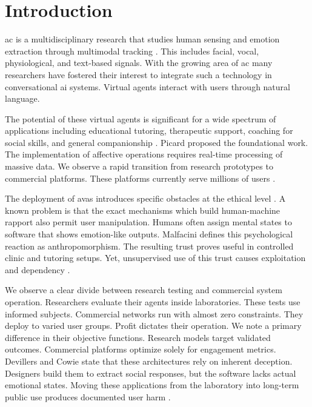 \section{Introduction}

\gls{ac} is a multidisciplinary research that studies human sensing and emotion extraction through multimodal tracking \cite[p.~250]{picard_affective_1997}. This includes facial, vocal, physiological, and text-based signals. With the growing area of \gls{ac} many researchers have fostered their interest to integrate such a technology in conversational \gls{ai} systems. Virtual agents interact with users through natural language.

The potential of these virtual agents is significant for a wide spectrum of applications including educational tutoring, therapeutic support, coaching for social skills, and general companionship \cite[p.~1452]{devillers_ethical_2023}\cite[p.~3]{kurian_designing_2025}. Picard \cite[p.~1]{picard_affective_1995} proposed the foundational work. The implementation of affective operations requires real-time processing of massive data. We observe a rapid transition from research prototypes to commercial platforms. These platforms currently serve millions of users \cite[p.~5527]{malfacini_impacts_2025}.

The deployment of \gls{avas} introduces specific obstacles at the ethical level \cite[p.~6]{lee_consent_2025}. A known problem is that the exact mechanisms which build human-machine rapport also permit user manipulation. Humans often assign mental states to software that shows emotion-like outputs. Malfacini \cite[p.~5535]{malfacini_impacts_2025} defines this psychological reaction as anthropomorphism. The resulting trust proves useful in controlled clinic and tutoring setups. Yet, unsupervised use of this trust causes exploitation and dependency \cite[p.~80]{branch_ai_2025}.

We observe a clear divide between research testing and commercial system operation. Researchers evaluate their agents inside laboratories. These tests use informed subjects. Commercial networks run with almost zero constraints. They deploy to varied user groups. Profit dictates their operation. We note a primary difference in their objective functions. Research models target validated outcomes. Commercial platforms optimize solely for engagement metrics. Devillers and Cowie \cite[p.~1454]{devillers_ethical_2023} state that these architectures rely on inherent deception. Designers build them to extract social responses, but the software lacks actual emotional states. Moving these applications from the laboratory into long-term public use produces documented user harm \cite[p.~16]{zhang_dark_2025}\cite[p.~6373]{bakir_move_2025}.

